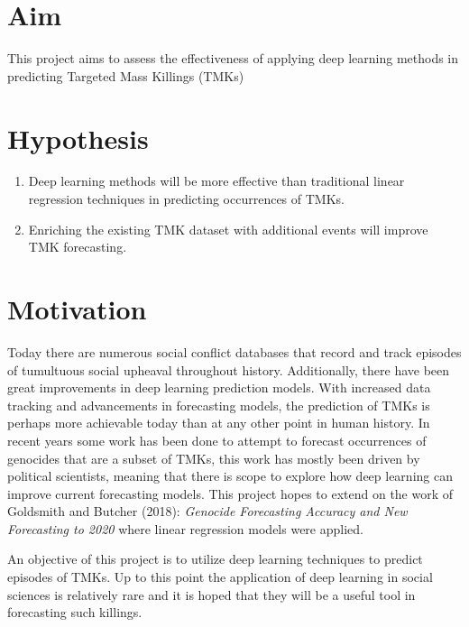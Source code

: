 \section{Aim}
This project aims to assess the effectiveness of applying deep learning methods in predicting Targeted Mass Killings (TMKs)\\

\section{Hypothesis}
\begin{enumerate}
  \item Deep learning methods will be more effective than traditional linear regression techniques in predicting occurrences of TMKs. 
  \item Enriching the existing TMK dataset with additional events will improve TMK forecasting.
\end{enumerate}

\section{Motivation}
Today there are numerous social conflict databases \cite{database} that record and track episodes of tumultuous social upheaval throughout history. Additionally, there have been great improvements in deep learning prediction models. With increased data tracking and advancements in forecasting models, the prediction of TMKs is perhaps more achievable today than at any other point in human history. In recent years some work has been done to attempt to forecast occurrences of genocides that are a subset of TMKs, this work has mostly been driven by political scientists, meaning that there is scope to explore how deep learning can improve current forecasting models. This project hopes to extend on the work of Goldsmith and Butcher (2018): \emph{Genocide Forecasting Accuracy and New Forecasting to 2020} \cite{Goldsmith2018} where linear regression models were applied.

An objective of this project is to utilize deep learning techniques to predict episodes of TMKs. Up to this point the application of deep learning in social sciences is relatively rare and it is hoped that they will be a useful tool in forecasting such killings.

